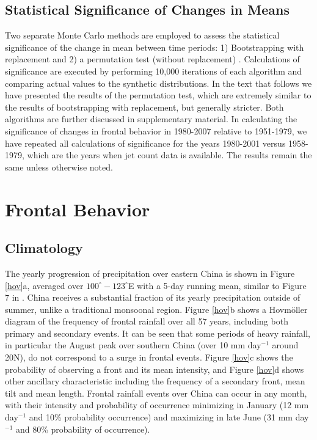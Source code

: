 \documentclass[draft,grl]{AGUTeX}
\begin{document}
\begin{article}
\subsection{Statistical Significance of Changes in Means}

	Two separate Monte Carlo methods are employed to assess the statistical significance of the change in mean between time periods: 1) Bootstrapping with replacement and 2) a permutation test (without replacement) \citep{Good2005}. Calculations of significance are executed by performing 10,000 iterations of each algorithm and comparing actual values to the synthetic distributions. In the text that follows we have presented the results of the permutation test, which are extremely similar to the results of bootstrapping with replacement, but generally stricter. Both algorithms are further discussed in supplementary material. In calculating the significance of changes in frontal behavior in 1980-2007 relative to 1951-1979, we have repeated all calculations of significance for the years 1980-2001 versus 1958-1979, which are the years when jet count data is available. The results remain the same unless otherwise noted.


\section{Frontal Behavior}	
	
\subsection{Climatology}	

	The yearly progression of precipitation over eastern China is shown in Figure \ref{hov}a, averaged over $100^\circ-123^\circ$E with a 5-day running mean, similar to Figure 7 in \citet{Ding2005}. China receives a substantial fraction of its yearly precipitation outside of summer, unlike a traditional monsoonal region. Figure \ref{hov}b shows a Hovm\"oller diagram of the frequency of frontal rainfall over all 57 years, including both primary and secondary events. It can be seen that some periods of heavy rainfall, in particular the August peak over southern China (over 10 mm day$^{-1}$ around 20\textdegree N), do not correspond to a surge in frontal events. Figure \ref{hov}c shows the probability of observing a front and its mean intensity, and Figure \ref{hov}d shows other ancillary characteristic including the frequency of a secondary front, mean tilt and mean length. Frontal rainfall events over China can occur in any month, with their intensity and probability of occurrence minimizing in January (12 mm day$^{-1}$ and 10\% probability occurrence) and maximizing in late June (31 mm day$^{-1}$ and 80\% probability of occurrence).
	

\end{article}
\end{document}
